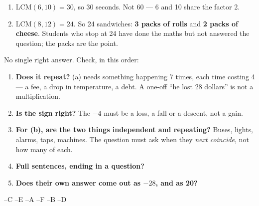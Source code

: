 \documentclass[12pt,a4paper]{article}
\begin{document}
\begin{enumerate}[label=\arabic*., itemsep=2pt]
  \item LCM$(6,10) = 30$, so 30 seconds. Not 60 --- 6 and 10 share the factor 2.
  \item LCM$(8,12) = 24$. So 24 sandwiches: \textbf{3 packs of rolls} and
        \textbf{2 packs of cheese}. Students who stop at 24 have done the maths but
        not answered the question; the packs are the point.
\end{enumerate}

\noindent No single right answer. Check, in this order:
\begin{enumerate}[label=\arabic*., itemsep=2pt]
  \item \textbf{Does it repeat?} (a) needs something happening 7 times, each time
        costing 4 --- a fee, a drop in temperature, a debt. A one-off ``he lost 28
        dollars'' is not a multiplication.
  \item \textbf{Is the sign right?} The $-4$ must be a loss, a fall or a descent, not
        a gain.
  \item \textbf{For (b), are the two things independent and repeating?} Buses, lights,
        alarms, taps, machines. The question must ask when they \emph{next coincide},
        not how many of each.
  \item \textbf{Full sentences, ending in a question?}
  \item \textbf{Does their own answer come out as $-28$, and as 20?}
\end{enumerate}

--C --E --A --F --B --D
\end{document}
